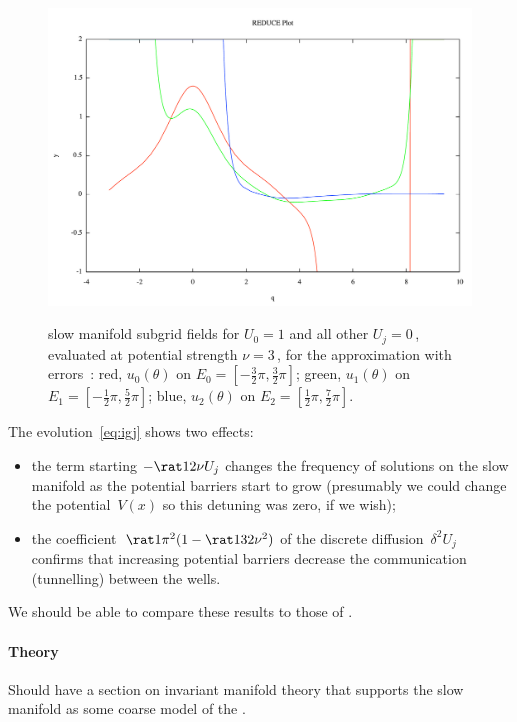 \documentclass[12pt,a5paper]{article}
\begin{document}
\begin{figure}
\centering
\includegraphics[width=\linewidth]{subgrid}\\
\caption{slow manifold subgrid fields for \(U_0=1\) and all other \(U_j=0\)\,, evaluated at potential strength \(\nu=3\)\,, for the approximation with errors~: 
red, \(u_0(\theta)\) on \(E_0=[-\frac32\pi,\frac32\pi]\);
green, \(u_1(\theta)\) on \(E_1=[-\frac12\pi,\frac52\pi]\);
blue, \(u_2(\theta)\) on \(E_2=[\frac12\pi,\frac72\pi]\).}
\label{fig:subgrid}
\end{figure}

The evolution~\eqref{eq:igj} shows two effects:
\begin{itemize}
\item the term starting \(-\rat12\nu U_j\) changes the frequency of solutions on the slow manifold as the potential barriers start to grow (presumably we could change the potential~\(V(x)\) so this detuning was zero, if we wish);
\item  the coefficient~\(\rat1{\pi^2}(1-\rat1{32}\nu^2)\) of the discrete diffusion~\(\delta^2U_j\) confirms that increasing potential barriers decrease the communication (tunnelling) between the wells.
\end{itemize}

We should be able to compare these results to those of \cite{Alfimov2002}.



\paragraph{Theory}  Should have a section on invariant manifold theory that supports the slow manifold as some coarse model of the \pde.
\end{document}
